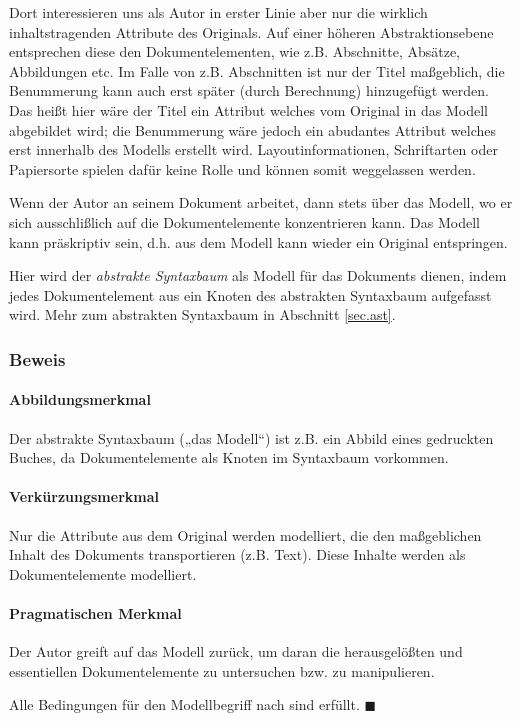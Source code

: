 Dort interessieren uns als Autor in erster Linie aber nur die wirklich inhaltstragenden
Attribute des Originals.
Auf einer höheren Abstraktionsebene entsprechen diese den Dokumentelementen, wie z.B.
Abschnitte, Absätze, Abbildungen etc.
Im Falle von z.B. Abschnitten ist nur der Titel maßgeblich, die Benummerung kann
auch erst später (durch Berechnung) hinzugefügt werden.
Das heißt hier wäre der Titel ein Attribut welches
vom Original in das Modell abgebildet wird; die Benummerung wäre jedoch ein abudantes
Attribut welches erst innerhalb des Modells erstellt wird.
Layoutinformationen, Schriftarten oder Papiersorte spielen dafür keine Rolle und
können somit weggelassen werden.

Wenn der Autor an seinem Dokument arbeitet, dann stets über das Modell,
wo er sich ausschlißlich auf die Dokumentelemente konzentrieren kann.
Das Modell kann präskriptiv sein, d.h. aus dem Modell kann wieder ein Original entspringen.

Hier wird der \emph{abstrakte Syntaxbaum} als Modell für das Dokuments dienen,
indem jedes Dokumentelement aus ein Knoten des abstrakten Syntaxbaum aufgefasst wird.
Mehr zum abstrakten Syntaxbaum in Abschnitt \ref{sec.ast}.

\subsubsection{Beweis}
\paragraph{Abbildungsmerkmal}
Der abstrakte Syntaxbaum („das Modell“) ist z.B. ein Abbild eines
gedruckten Buches, da Dokumentelemente als Knoten im Syntaxbaum vorkommen.
\paragraph{Verkürzungsmerkmal}
Nur die Attribute aus dem Original werden modelliert, die den maßgeblichen Inhalt des
Dokuments transportieren (z.B. Text). Diese Inhalte werden als Dokumentelemente
modelliert.
\paragraph{Pragmatischen Merkmal}
Der Autor greift auf das Modell zurück, um daran die herausgelößten und essentiellen
Dokumentelemente zu untersuchen bzw. zu manipulieren.

Alle Bedingungen für den Modellbegriff nach \citep{stachowiak} sind erfüllt. $\blacksquare$

